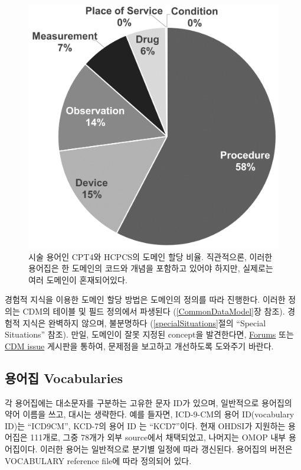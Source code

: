 \documentclass[10.5pt]{book}
\theoremstyle{definition}
\theoremstyle{definition}
\theoremstyle{definition}
\theoremstyle{remark}
\begin{document}
\begin{figure}

{\centering \includegraphics[width=0.7\linewidth]{images/StandardizedVocabularies/domains} 

}

\caption{시술 용어인 CPT4와 HCPCS의 도메인 할당 비율. 직관적으론, 이러한 용어집은 한 도메인의 코드와 개념을 포함하고 있어야 하지만, 실제로는 여러 도메인이 혼재되어있다.}\label{fig:domains}
\end{figure}

경험적 지식을 이용한 도메인 할당 방법은 도메인의 정의를 따라 진행한다.
이러한 정의는 CDM의 테이블 및 필드 정의에서 파생된다
(\ref{CommonDataModel}장 참조). 경험적 지식은 완벽하지 않으며,
불분명하다 (\ref{specialSituations}절의 ``Special Situations'' 참조).
만일, 도메인이 잘못 지정된 concept을 발견한다면,
\href{https://forums.ohdsi.org}{Forums} 또는
\href{https://github.com/OHDSI/CommonDataModel/issues}{CDM issue}
게시판을 통하여, 문제점을 보고하고 개선하도록 도와주기 바란다.

\subsection{용어집 Vocabularies}\label{-vocabularies}

각 용어집에는 대소문자를 구분하는 고유한 문자 ID가 있으며, 일반적으로
용어집의 약어 이름을 쓰고, 대시는 생략한다. 예를 들자면, ICD-9-CM의 용어
ID(vocabulary ID)는 ``ICD9CM'', KCD-7의 용어 ID 는 ``KCD7''이다. 현재
OHDSI가 지원하는 용어집은 111개로, 그중 78개가 외부 source에서
채택되었고, 나머지는 OMOP 내부 용어집이다. 이러한 용어는 일반적으로
분기별 일정에 따라 갱신된다. 용어집의 버전은 VOCABULARY reference file에
따라 정의되어 있다. 
\end{document}
